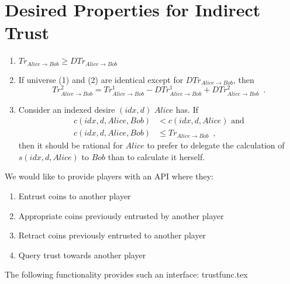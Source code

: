 \section{Desired Properties for Indirect Trust}
  \begin{enumerate}
    \item $Tr_{Alice \rightarrow Bob} \geq DTr_{Alice \rightarrow Bob}$
    \item If universe (1) and (2) are identical except for $DTr_{Alice \rightarrow Bob}$, then
      \begin{equation*}
	Tr^2_{Alice \rightarrow Bob} = Tr^1_{Alice \rightarrow Bob} - DTr^1_{Alice \rightarrow Bob} + DTr^2_{Alice \rightarrow
	Bob} \enspace.
      \end{equation*}
    \item Consider an indexed desire $\left(idx, d\right)$ $Alice$ has. If
    \begin{align*}
      c\left(idx, d, Alice, Bob\right) & < c\left(idx, d, Alice\right) \mbox{ and} \\
      c\left(idx, d, Alice, Bob\right) & \leq Tr_{Alice \rightarrow Bob} \enspace,
    \end{align*}
    then it should be rational for $Alice$ to prefer to delegate the calculation of $s\left(idx, d, Alice\right)$ to $Bob$ than
    to calculate it herself.
  \end{enumerate}

  We would like to provide players with an API where they:
  \begin{enumerate}
    \item Entrust coins to another player
    \item Appropriate coins previously entrusted by another player
    \item Retract coins previously entrusted to another player
    \item Query trust towards another player
  \end{enumerate}
  The following functionality provides such an interface:
  {trustfunc.tex}
